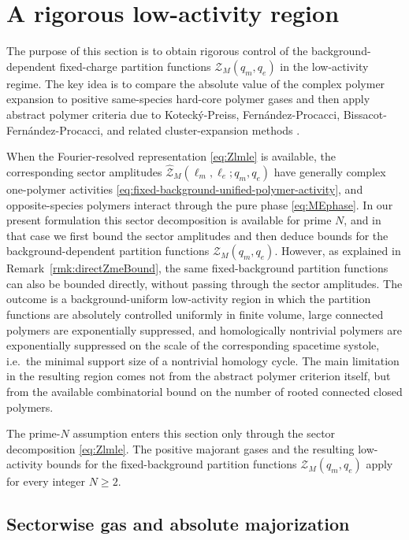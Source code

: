 \documentclass[dvipsnames,a4paper]{article}
\numberwithin{equation}{section}
\theoremstyle{definition}
\theoremstyle{remark}
\begin{document}
\section{A rigorous low-activity region}
\label{sec:low-activity}

The purpose of this section is to obtain rigorous control of the background-dependent
fixed-charge partition functions
\(\mathcal Z_M(q_m,q_e)\) in the low-activity regime. The key idea is to compare the
absolute value of the complex polymer expansion to positive same-species hard-core polymer
gases and then apply abstract polymer criteria due to Koteck\'y-Preiss,
Fern\'andez-Procacci, Bissacot-Fern\'andez-Procacci, and related cluster-expansion
methods
\cite{KoteckyPreiss1986,FernandezProcacci2007,BissacotFernandezProcacci2010,Ueltschi2004}.

When the Fourier-resolved representation \eqref{eq:Zlmle} is available, the corresponding sector amplitudes \(\widehat{\mathcal Z}_M(\ell_m,\ell_e;q_m,q_e)\) have generally complex one-polymer activities \eqref{eq:fixed-background-unified-polymer-activity}, and opposite-species polymers interact through the pure phase \eqref{eq:MEphase}. In our present formulation this sector decomposition is available for prime \(N\), and in that case we first bound the sector amplitudes and then deduce bounds for the background-dependent partition functions \(\mathcal Z_M(q_m,q_e)\). However, as explained in Remark~\ref{rmk:directZmeBound}, the same fixed-background partition functions can also be bounded directly, without passing through the sector amplitudes. The outcome is a background-uniform low-activity region in which the partition functions are absolutely controlled uniformly in finite volume, large connected polymers are exponentially suppressed, and homologically nontrivial polymers are exponentially suppressed on the scale of the corresponding spacetime systole, i.e.\ the minimal support size of a nontrivial homology cycle. The main limitation in the resulting region comes not from the abstract polymer criterion itself, but from the available combinatorial bound on the number of rooted connected closed polymers.

The prime-\(N\) assumption enters this section only through the sector
decomposition \eqref{eq:Zlmle}. The positive majorant gases and the resulting low-activity
bounds for the fixed-background partition functions \(\mathcal Z_M(q_m,q_e)\) apply for
every integer \(N\ge 2\).

\subsection{Sectorwise gas and absolute majorization}
\label{sec:low-activity-abstract-polymer}
\end{document}

